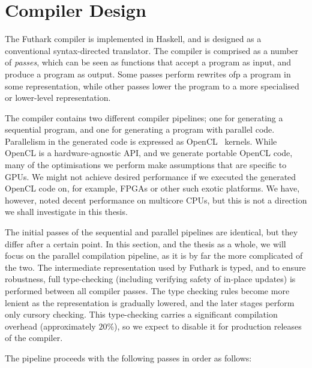 \section{Compiler Design}
\label{sec:compiler-design}

The Futhark compiler is implemented in Haskell, and is designed as a
conventional syntax-directed translator.  The compiler is comprised as
a number of \textit{passes}, which can be seen as functions that
accept a program as input, and produce a program as output.  Some
passes perform rewrites ofp a program in some representation, while
other passes lower the program to a more specialised or lower-level
representation.

The compiler contains two different compiler pipelines; one for
generating a sequential program, and one for generating a program with
parallel code.  Parallelism in the generated code is expressed as
OpenCL~\cite{Stone:2010:OPP:622179.1803953} kernels.  While OpenCL is
a hardware-agnostic API, and we generate portable OpenCL code, many of
the optimisations we perform make assumptions that are specific to
GPUs.  We might not achieve desired performance if we executed the
generated OpenCL code on, for example, FPGAs or other such exotic
platforms.  We have, however, noted decent performance on multicore
CPUs, but this is not a direction we shall investigate in this thesis.

The initial passes of the sequential and parallel pipelines are
identical, but they differ after a certain point.  In this section,
and the thesis as a whole, we will focus on the parallel compilation
pipeline, as it is by far the more complicated of the two.  The
intermediate representation used by Futhark is typed, and to ensure
robustness, full type-checking (including verifying safety of in-place
updates) is performed between all compiler passes.  The type checking
rules become more lenient as the representation is gradually lowered,
and the later stages perform only cursory checking.  This
type-checking carries a significant compilation overhead
(approximately $20\%$), so we expect to disable it for production
releases of the compiler.

The pipeline proceeds with the following passes in order as follows:

